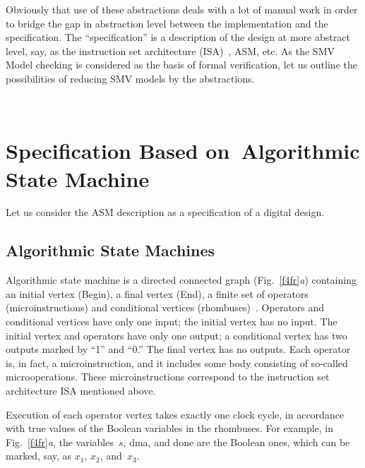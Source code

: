 \begin{multicols}{2}
Obviously that use of these abstractions deals with a lot of manual work in order to bridge the 
gap in abstraction level between the implementation and the specification. The ``specification'' is 
a description of the design at more abstract level, say, as the instruction set architecture 
(ISA)~\cite{13fr}, ASM, etc. As the SMV Model checking is considered as the basis of 
formal verification, let us outline the possibilities of reducing SMV models by the abstractions.     

       \begin{figure*} %
       \vspace*{1pt}
\begin{center}
\mbox{%
\epsfxsize=166mm
}
\end{center}
\vspace*{-6pt}
       \vspace*{-2pt}
       \end{figure*}

\section{Specification Based on~Algorithmic State Machine}

\noindent
Let us consider the ASM description as a specification of a digital design. 

\subsection{Algorithmic State Machines} %
   
\noindent
Algorithmic state machine is a directed connected graph (Fig.~\ref{f4fr}\textit{a}) containing an initial vertex 
(Begin), a final vertex (End), a finite set of operators (microinstructions) and 
conditional vertices  (rhombuses)~\cite{4fr}. Operators and conditional vertices have only one 
input; the initial vertex has no input. The initial vertex and operators have only one output; a 
conditional vertex has two outputs marked by ``1'' and ``0.'' The final vertex has no outputs. 
Each operator is, in fact, a microinstruction, and it includes some body consisting of 
   so-called microoperations. These microinstructions correspond to the instruction set 
architecture ISA mentioned above. 
   
   Execution of each operator vertex takes exactly one clock cycle, in accordance with true 
values of the Boolean variables  in the rhombuses. For example, in Fig.~\ref{f4fr}\textit{a}, 
the variables~$s$, dma, and done are the Boolean ones, which can be marked, say, as $x_1$, 
$x_2$, and~$x_3$.
       

\end{multicols}

